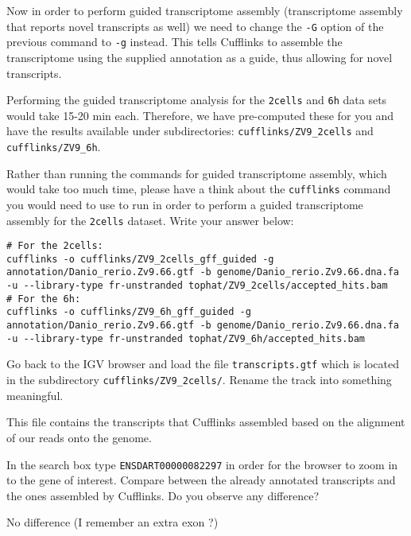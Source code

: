 Now in order to perform guided transcriptome assembly (transcriptome assembly
that reports novel transcripts as well) we need to change the \texttt{-G}
option of the previous command to \texttt{-g} instead.
This tells Cufflinks to assemble the transcriptome using the supplied
annotation as a guide, thus allowing for novel transcripts.

\begin{information}
Performing the guided transcriptome analysis for the \texttt{2cells} and
\texttt{6h} data sets would take 15-20 min each. Therefore, we have
pre-computed these for you and have the results available under subdirectories:
\texttt{cufflinks/ZV9\_2cells} and \texttt{cufflinks/ZV9\_6h}.
\end{information}

\begin{questions}
Rather than running the commands for guided transcriptome assembly, which would
take too much time, please have a think about the \texttt{cufflinks} command you would
need to use to run in order to perform a guided transcriptome assembly
for the \texttt{2cells} dataset. Write your answer below:
\begin{answer}
\begin{lstlisting}
# For the 2cells:
cufflinks -o cufflinks/ZV9_2cells_gff_guided -g annotation/Danio_rerio.Zv9.66.gtf -b genome/Danio_rerio.Zv9.66.dna.fa -u --library-type fr-unstranded tophat/ZV9_2cells/accepted_hits.bam
# For the 6h:
cufflinks -o cufflinks/ZV9_6h_gff_guided -g annotation/Danio_rerio.Zv9.66.gtf -b genome/Danio_rerio.Zv9.66.dna.fa -u --library-type fr-unstranded tophat/ZV9_6h/accepted_hits.bam
\end{lstlisting}
\end{answer}

\end{questions}

\begin{steps}
Go back to the IGV browser and load the file \texttt{transcripts.gtf} which is located
in the subdirectory \texttt{cufflinks/ZV9\_2cells/}. Rename the track into
something meaningful.

This file contains the transcripts that Cufflinks assembled based on the
alignment of our reads onto the genome.
\end{steps}

\begin{questions}
In the search box type \texttt{ENSDART00000082297} in order for the browser to zoom in
to the gene of interest. Compare between the already annotated transcripts and
the ones assembled by Cufflinks. Do you observe any difference?
\begin{answer}
No difference (I remember an extra exon ?)
\end{answer}

\end{questions}


